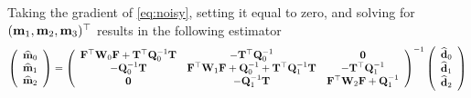 \documentclass[11pt]{article}
\newcommand{\bfF}	{{\bf{F}}}
\newcommand{\bfI}	{{\bf{I}}}
\newcommand{\bfQ}	{{\bf{Q}}}
\newcommand{\bfT}	{{\bf{T}}}
\newcommand{\bfW}	{{\bf{W}}}
\newcommand{\bfd}	{{\bf{d}}}
\newcommand{\bfm}	{{\bf{m}}}
\newcommand {\zero}  { {\bf 0} }
\newcommand{\bfmhat}    {{\widehat{\bfm}}}
\newcommand{\bfdhat}    {{\widehat{\bfd}}}
\begin{document}
Taking the gradient of \eqref{eq:noisy},
 setting it equal to zero, and solving for $(\bfm_1,  \bfm_2, \bfm_3)^{\top} $ results in the following estimator 
\begin{eqnarray}
\nonumber
\left(\begin{array}{c}  \bfmhat_0  \\ \bfmhat_1 \\ \bfmhat_2 \end{array}\right)=
\left(\begin{array}{ccc}\bfF^{\top}\bfW_0\bfF + \bfT^{\top}\bfQ^{-1}_0\bfT   & -\bfT^{\top}\bfQ^{-1}_0 & \zero\\
 -\bfQ^{-1}_0\bfT & \bfF^{\top}\bfW_1\bfF + \bfQ^{-1}_0 + \bfT^{\top}\bfQ^{-1}_1\bfT  & -\bfT^{\top}\bfQ^{-1}_1\\
 \zero & -\bfQ^{-1}_1\bfT & \bfF^{\top}\bfW_2\bfF + \bfQ^{-1}_1  
 \end{array}\right)^{-1}	
\left(\begin{array}{c}\bfdhat_0  \\  \bfdhat_1 \\
\bfdhat_2 
\end{array}\right)	
\end{eqnarray}
\end{document}
